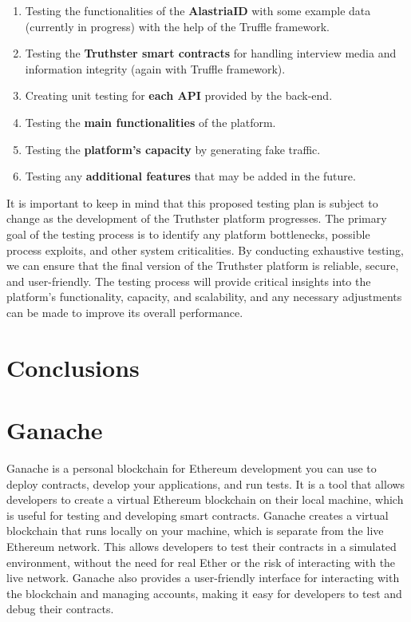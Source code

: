\documentclass[target=mst,aauheader=]{thud}
\begin{document}
\begin{enumerate}

    \item Testing the functionalities of the \textbf{AlastriaID} with some example data (currently in progress) with the help of the Truffle framework.
    \item Testing the \textbf{Truthster smart contracts} for handling interview media and information integrity (again with Truffle framework).
    \item Creating unit testing for \textbf{each API} provided by the back-end.
    \item Testing the \textbf{main functionalities} of the platform.
    \item Testing the \textbf{platform's capacity} by generating fake traffic.
    \item Testing any \textbf{additional features} that may be added in the future.

\end{enumerate}

It is important to keep in mind that this proposed testing plan is subject to change as the development of the Truthster platform progresses. The primary goal of the testing process is to identify any platform bottlenecks, possible process exploits, and other system criticalities. By conducting exhaustive testing, we can ensure that the final version of the Truthster platform is reliable, secure, and user-friendly. The testing process will provide critical insights into the platform's functionality, capacity, and scalability, and any necessary adjustments can be made to improve its overall performance.

\chapter{Conclusions}
\label{chapter:conclusions}

\appendix


\chapter{Ganache}
\label{appendixGanache}
Ganache is a personal blockchain for Ethereum development you can use to deploy contracts, develop your applications, and run tests. It is a tool that allows developers to create a virtual Ethereum blockchain on their local machine, which is useful for testing and developing smart contracts. Ganache creates a virtual blockchain that runs locally on your machine, which is separate from the live Ethereum network. This allows developers to test their contracts in a simulated environment, without the need for real Ether or the risk of interacting with the live network. Ganache also provides a user-friendly interface for interacting with the blockchain and managing accounts, making it easy for developers to test and debug their contracts.\par
\end{document}
